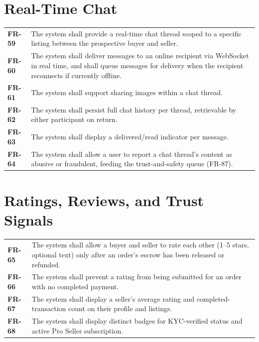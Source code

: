 \documentclass[11pt,a4paper]{report}
\newenvironment{reqtable}{\begin{longtable}{p{2.2cm}p{11.5cm}}}{\end{longtable}}
\begin{document}
\section{Real-Time Chat}
\begin{reqtable}
\textbf{FR-59} & The system shall provide a real-time chat thread scoped to a specific listing between the prospective buyer and seller. \\
\textbf{FR-60} & The system shall deliver messages to an online recipient via WebSocket in real time, and shall queue messages for delivery when the recipient reconnects if currently offline. \\
\textbf{FR-61} & The system shall support sharing images within a chat thread. \\
\textbf{FR-62} & The system shall persist full chat history per thread, retrievable by either participant on return. \\
\textbf{FR-63} & The system shall display a delivered/read indicator per message. \\
\textbf{FR-64} & The system shall allow a user to report a chat thread's content as abusive or fraudulent, feeding the trust-and-safety queue (FR-87). \\
\end{reqtable}

\section{Ratings, Reviews, and Trust Signals}
\begin{reqtable}
\textbf{FR-65} & The system shall allow a buyer and seller to rate each other (1--5 stars, optional text) only after an order's escrow has been released or refunded. \\
\textbf{FR-66} & The system shall prevent a rating from being submitted for an order with no completed payment. \\
\textbf{FR-67} & The system shall display a seller's average rating and completed-transaction count on their profile and listings. \\
\textbf{FR-68} & The system shall display distinct badges for KYC-verified status and active Pro Seller subscription. \\
\end{reqtable}
\end{document}
